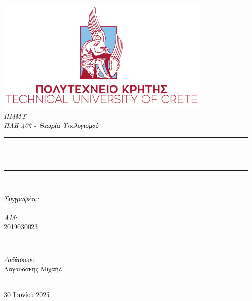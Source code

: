 \doublespacing
\begin{titlepage}
    \newcommand{\HRule}{\rule{\linewidth}{1mm}}
    \center
    \includegraphics[width=0.7\linewidth]{title/TUC_Logo.png}\\[1cm]
    \textsl{\Large ΉΜΜΥ}\\[0.5cm]
    \textsl{\Huge ΠΛΗ 402 - Θεωρία Υπολογισμού}\\[1cm]
    \makeatletter
    \HRule \\[0.6cm]
    { \huge \bfseries \@title}\\[0.3cm]
    \HRule \\[2cm]
    \large

    \begin{minipage}{0.45\textwidth}
    	\begin{flushleft}
            \emph{Συγγραφέας:}\\
            \@author \\

            \emph{AM:}\\
            2019030023
        \end{flushleft}
    \end{minipage}
    ~
    \begin{minipage}{0.45\textwidth}
    	\begin{flushright}
            {\emph{Διδάσκων:}} \\
            \textup{Λαγουδάκης Μιχαήλ}
        \end{flushright}
    \end{minipage}\\[2cm]
    \makeatother
    {\large 30 Ιουνίου 2025}\\%


\end{titlepage}